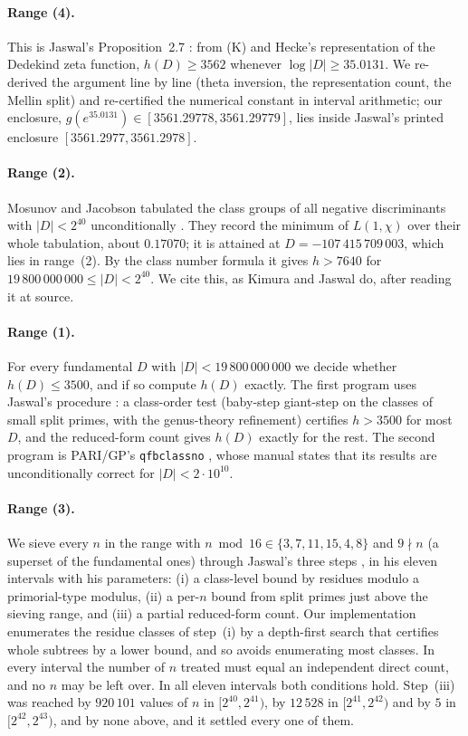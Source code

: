 \documentclass[11pt]{article}
\theoremstyle{definition}
\begin{document}
\paragraph{Range (4).} This is Jaswal's Proposition~2.7 \cite{Jaswal2026}: from (K) and Hecke's representation of the
Dedekind zeta function, $h(D) \ge 3562$ whenever $\log|D| \ge 35.0131$. We re-derived the argument line by line (theta
inversion, the representation count, the Mellin split) and re-certified the numerical constant in interval arithmetic;
our enclosure, $g(e^{35.0131}) \in [3561.29778, 3561.29779]$, lies inside Jaswal's printed enclosure
$[3561.2977, 3561.2978]$.

\paragraph{Range (2).} Mosunov and Jacobson tabulated the class groups of all negative discriminants with $|D| < 2^{40}$
unconditionally \cite{MJ16}. They record the minimum of $L(1,\chi)$ over their whole tabulation, about $0.17070$; it is attained
at $D = -107\,415\,709\,003$, which lies in range~(2). By the class number formula it gives $h > 7640$ for
$19\,800\,000\,000 \le |D| < 2^{40}$. We cite this, as Kimura and Jaswal do, after reading it at source.

\paragraph{Range (1).} For every fundamental $D$ with $|D| < 19\,800\,000\,000$ we decide whether $h(D) \le 3500$, and if so
compute $h(D)$ exactly. The first program uses Jaswal's procedure \cite[\S3.1]{Jaswal2026}: a class-order test
(baby-step giant-step on the classes of small split primes, with the genus-theory refinement) certifies $h > 3500$ for most
$D$, and the reduced-form count gives $h(D)$ exactly for the rest. The second program is PARI/GP's \texttt{qfbclassno}
\cite{PARI}, whose manual states that its results are unconditionally correct for $|D| < 2\cdot10^{10}$.

\paragraph{Range (3).}\label{sec:range3} We sieve every $n$ in the range with $n \bmod 16 \in \{3,7,11,15,4,8\}$ and
$9 \nmid n$ (a superset of the fundamental ones) through Jaswal's three steps \cite[\S3.2]{Jaswal2026}, in his eleven
intervals with his parameters: (i) a class-level bound by residues modulo a primorial-type modulus, (ii) a per-$n$ bound
from split primes just above the sieving range, and (iii) a partial reduced-form count. Our implementation enumerates the
residue classes of step~(i) by a depth-first search that certifies whole subtrees by a lower bound, and so avoids
enumerating most classes. In every interval the number of $n$ treated must equal an independent direct count, and no $n$
may be left over. In all eleven intervals both conditions hold. Step~(iii) was reached by $920\,101$ values of $n$ in
$[2^{40}, 2^{41})$, by $12\,528$ in $[2^{41}, 2^{42})$ and by $5$ in $[2^{42}, 2^{43})$, and by none above, and it settled
every one of them.
\end{document}

